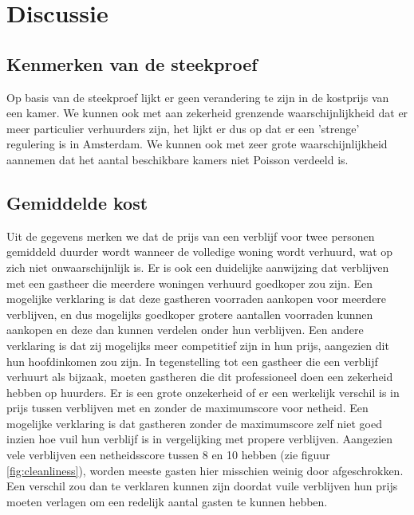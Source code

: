 \documentclass[a4paper]{kulakarticle}
\begin{document}
	
	\section{Discussie}
	
	\subsection{Kenmerken van de steekproef}
	Op basis van de steekproef lijkt er geen verandering te zijn in de kostprijs van een kamer. We kunnen ook met aan zekerheid grenzende waarschijnlijkheid dat er meer particulier verhuurders zijn, het lijkt er dus op dat er een 'strenge' regulering is in Amsterdam. We kunnen ook met zeer grote waarschijnlijkheid aannemen dat het aantal beschikbare kamers niet Poisson verdeeld is.
	
	\subsection{Gemiddelde kost}
	
	Uit de gegevens merken we dat de prijs van een verblijf voor twee personen gemiddeld duurder wordt wanneer de volledige woning wordt verhuurd, wat op zich niet onwaarschijnlijk is.
	Er is ook een duidelijke aanwijzing dat verblijven met een gastheer die meerdere woningen verhuurd goedkoper zou zijn. Een mogelijke verklaring is dat deze gastheren voorraden aankopen voor meerdere verblijven, en dus mogelijks goedkoper grotere aantallen voorraden kunnen aankopen en deze dan kunnen verdelen onder hun verblijven. Een andere verklaring is dat zij mogelijks meer competitief zijn in hun prijs, aangezien dit hun hoofdinkomen zou zijn. In tegenstelling tot een gastheer die een verblijf verhuurt als bijzaak, moeten gastheren die dit professioneel doen een zekerheid hebben op huurders.
	Er is een grote onzekerheid of er een werkelijk verschil is in prijs tussen verblijven met en zonder de maximumscore voor netheid. Een mogelijke verklaring is dat gastheren zonder de maximumscore zelf niet goed inzien hoe vuil hun verblijf is in vergelijking met propere verblijven. Aangezien vele verblijven een netheidsscore tussen 8 en 10 hebben (zie figuur \ref{fig:cleanliness}), worden meeste gasten hier misschien weinig door afgeschrokken. Een verschil zou dan te verklaren kunnen zijn doordat vuile verblijven hun prijs moeten verlagen om een redelijk aantal gasten te kunnen hebben.
	
\end{document}
